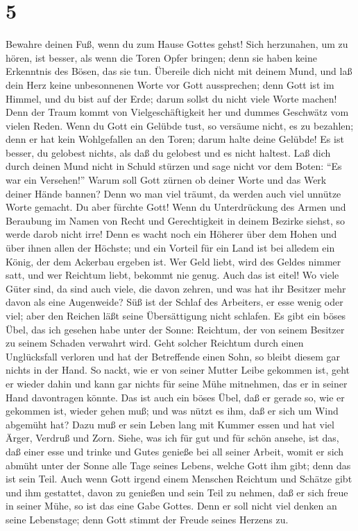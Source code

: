 \hypertarget{section-4}{%
\section{5}\label{section-4}}

 Bewahre deinen Fuß, wenn du zum Hause Gottes gehst! Sich
herzunahen, um zu hören, ist besser, als wenn die Toren Opfer bringen;
denn sie haben keine Erkenntnis des Bösen, das sie tun. 
Übereile dich nicht mit deinem Mund, und laß dein Herz keine
unbesonnenen Worte vor Gott aussprechen; denn Gott ist im Himmel, und du
bist auf der Erde; darum sollst du nicht viele Worte machen!
 Denn der Traum kommt von Vielgeschäftigkeit her und
dummes Geschwätz vom vielen Reden.  Wenn du Gott ein
Gelübde tust, so versäume nicht, es zu bezahlen; denn er hat kein
Wohlgefallen an den Toren; darum halte deine Gelübde!  Es
ist besser, du gelobest nichts, als daß du gelobest und es nicht
haltest.  Laß dich durch deinen Mund nicht in Schuld
stürzen und sage nicht vor dem Boten: ``Es war ein Versehen!'' Warum
soll Gott zürnen ob deiner Worte und das Werk deiner Hände bannen?
 Denn wo man viel träumt, da werden auch viel unnütze
Worte gemacht. Du aber fürchte Gott!  Wenn du
Unterdrückung des Armen und Beraubung im Namen von Recht und
Gerechtigkeit in deinem Bezirke siehst, so werde darob nicht irre! Denn
es wacht noch ein Höherer über dem Hohen und über ihnen allen der
Höchste;  und ein Vorteil für ein Land ist bei alledem ein
König, der dem Ackerbau ergeben ist.  Wer Geld liebt,
wird des Geldes nimmer satt, und wer Reichtum liebt, bekommt nie genug.
Auch das ist eitel!  Wo viele Güter sind, da sind auch
viele, die davon zehren, und was hat ihr Besitzer mehr davon als eine
Augenweide?  Süß ist der Schlaf des Arbeiters, er esse
wenig oder viel; aber den Reichen läßt seine Übersättigung nicht
schlafen.  Es gibt ein böses Übel, das ich gesehen habe
unter der Sonne: Reichtum, der von seinem Besitzer zu seinem Schaden
verwahrt wird.  Geht solcher Reichtum durch einen
Unglücksfall verloren und hat der Betreffende einen Sohn, so bleibt
diesem gar nichts in der Hand.  So nackt, wie er von
seiner Mutter Leibe gekommen ist, geht er wieder dahin und kann gar
nichts für seine Mühe mitnehmen, das er in seiner Hand davontragen
könnte.  Das ist auch ein böses Übel, daß er gerade so,
wie er gekommen ist, wieder gehen muß; und was nützt es ihm, daß er sich
um Wind abgemüht hat?  Dazu muß er sein Leben lang mit
Kummer essen und hat viel Ärger, Verdruß und Zorn. 
Siehe, was ich für gut und für schön ansehe, ist das, daß einer esse und
trinke und Gutes genieße bei all seiner Arbeit, womit er sich abmüht
unter der Sonne alle Tage seines Lebens, welche Gott ihm gibt; denn das
ist sein Teil.  Auch wenn Gott irgend einem Menschen
Reichtum und Schätze gibt und ihm gestattet, davon zu genießen und sein
Teil zu nehmen, daß er sich freue in seiner Mühe, so ist das eine Gabe
Gottes.  Denn er soll nicht viel denken an seine
Lebenstage; denn Gott stimmt der Freude seines Herzens zu.

